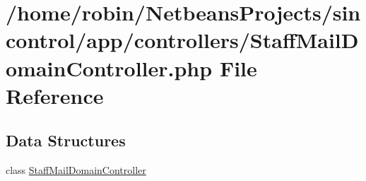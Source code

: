 \hypertarget{_staff_mail_domain_controller_8php}{}\section{/home/robin/\+Netbeans\+Projects/sincontrol/app/controllers/\+Staff\+Mail\+Domain\+Controller.php File Reference}
\label{_staff_mail_domain_controller_8php}
\subsection*{Data Structures}
\begin{DoxyCompactItemize}
\item 
class \hyperlink{class_staff_mail_domain_controller}{Staff\+Mail\+Domain\+Controller}
\end{DoxyCompactItemize}
